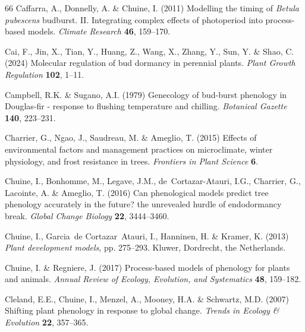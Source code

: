 \documentclass[11pt]{article}
\begin{document}
\begin{thebibliography}{66}
Caffarra, A., Donnelly, A. \& Chuine, I. (2011) {Modelling the timing of
  \emph{Betula pubescens} budburst. II. Integrating complex effects of
  photoperiod into process-based models}. \emph{Climate Research} \textbf{46},
  159--170.

Cai, F., Jin, X., Tian, Y., Huang, Z., Wang, X., Zhang, Y., Sun, Y. \& Shao, C.
  (2024) Molecular regulation of bud dormancy in perennial plants. \emph{Plant
  Growth Regulation} \textbf{102}, 1--11.

Campbell, R.K. \& Sugano, A.I. (1979) {Genecology of bud-burst phenology in
  Douglas-fir - response to flushing temperature and chilling}. \emph{Botanical
  Gazette} \textbf{140}, 223--231.

Charrier, G., Ngao, J., Saudreau, M. \& Ameglio, T. (2015) Effects of
  environmental factors and management practices on microclimate, winter
  physiology, and frost resistance in trees. \emph{Frontiers in Plant Science}
  \textbf{6}.

Chuine, I., Bonhomme, M., Legave, J.M., de~Cortazar-Atauri, I.G., Charrier, G.,
  Lacointe, A. \& Ameglio, T. (2016) Can phenological models predict tree
  phenology accurately in the future? the unrevealed hurdle of endodormancy
  break. \emph{Global Change Biology} \textbf{22}, 3444--3460.

Chuine, I., Garcia~de Cortazar~Atauri, I., Hanninen, H. \& Kramer, K. (2013)
  \emph{Plant development models}, pp. 275--293. Kluwer, Dordrecht, the
  Netherlands.

Chuine, I. \& Regniere, J. (2017) Process-based models of phenology for plants
  and animals. \emph{Annual Review of Ecology, Evolution, and Systematics}
  \textbf{48}, 159--182.

Cleland, E.E., Chuine, I., Menzel, A., Mooney, H.A. \& Schwartz, M.D. (2007)
  Shifting plant phenology in response to global change. \emph{Trends in
  Ecology \& Evolution} \textbf{22}, 357--365.


\end{thebibliography}
\end{document}
